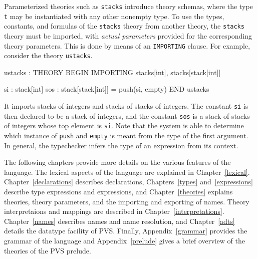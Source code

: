 Parameterized theories such as \texttt{stacks} introduce theory schemas,
where the type \texttt{t} may be instantiated with any other nonempty
type.  To use the types, constants, and formulas of the \texttt{stacks}
theory from another theory, the \texttt{stacks} theory must be imported,
with \emph{actual parameters} provided for the corresponding theory
parameters.  This is done by means of an \texttt{IMPORTING} clause. For
example, consider the theory \texttt{ustacks}.
\begin{session}
  ustacks : THEORY
   BEGIN
    IMPORTING stacks[int], stacks[stack[int]]

    si : stack[int]
    sos : stack[stack[int]] = push(si, empty)
   END ustacks
\end{session}
It imports stacks of integers and stacks of stacks of integers.  The constant
\texttt{si} is then declared to be a stack of integers, and the constant
\texttt{sos} is a stack of stacks of integers whose top element is
\texttt{si}.  Note that the system is able to determine which instance of
\texttt{push} and \texttt{empty} is meant from the type of the first
argument.  In general, the typechecker infers the type of an expression
from its context.  

The following chapters provide more details on the various features of the
language.  The lexical aspects of the language are explained in
Chapter~\ref{lexical}.  Chapter~\ref{declarations} describes declarations,
Chapters~\ref{types} and~\ref{expressions} describe type expressions and
expressions, and Chapter~\ref{theories} explains theories, theory
parameters, and the importing and exporting of names.  Theory
interpretaions and mappings are described in
Chapter~\ref{interpretations}.  Chapter~\ref{names} describes names and
name resolution, and Chapter~\ref{adts} details the datatype facility of
PVS.  Finally, Appendix~\ref{grammar} provides the grammar of the
language and Appendix~\ref{prelude} gives a brief overview of the theories
of the PVS prelude.
